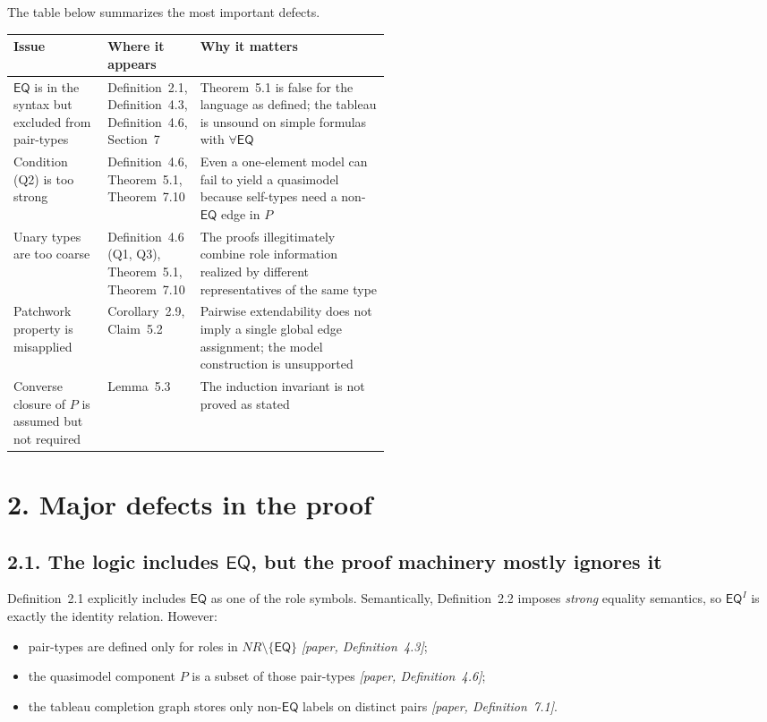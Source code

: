 \documentclass[11pt]{article}
\newcommand{\Paper}[1]{\textit{[paper, #1]}}
\newcommand{\role}[1]{\ensuremath{\mathsf{#1}}}
\newcommand{\EQ}{\role{EQ}}
\begin{document}
The table below summarizes the most important defects.

\begin{center}
\renewcommand{\arraystretch}{1.25}
\begin{tabularx}{\linewidth}{>{\raggedright\arraybackslash}p{0.25\linewidth}>{\raggedright\arraybackslash}p{0.24\linewidth}X}
\toprule
\textbf{Issue} & \textbf{Where it appears} & \textbf{Why it matters} \\
\midrule
$\EQ$ is in the syntax but excluded from pair-types & Definition~2.1, Definition~4.3, Definition~4.6, Section~7 & Theorem~5.1 is false for the language as defined; the tableau is unsound on simple formulas with $\forall \EQ$ \\
\addlinespace[0.2em]
Condition (Q2) is too strong & Definition~4.6, Theorem~5.1, Theorem~7.10 & Even a one-element model can fail to yield a quasimodel because self-types need a non-$\EQ$ edge in $P$ \\
\addlinespace[0.2em]
Unary types are too coarse & Definition~4.6 (Q1, Q3), Theorem~5.1, Theorem~7.10 & The proofs illegitimately combine role information realized by different representatives of the same type \\
\addlinespace[0.2em]
Patchwork property is misapplied & Corollary~2.9, Claim~5.2 & Pairwise extendability does not imply a single global edge assignment; the model construction is unsupported \\
\addlinespace[0.2em]
Converse closure of $P$ is assumed but not required & Lemma~5.3 & The induction invariant is not proved as stated \\
\bottomrule
\end{tabularx}
\end{center}

\section*{2. Major defects in the proof}

\subsection*{2.1. The logic includes $\EQ$, but the proof machinery mostly ignores it}

Definition~2.1 explicitly includes $\EQ$ as one of the role symbols. Semantically, Definition~2.2 imposes \emph{strong} equality semantics, so $\EQ^I$ is exactly the identity relation. However:

\begin{itemize}
    \item pair-types are defined only for roles in $NR \setminus \{\EQ\}$ \Paper{Definition~4.3};
    \item the quasimodel component $P$ is a subset of those pair-types \Paper{Definition~4.6};
    \item the tableau completion graph stores only non-$\EQ$ labels on distinct pairs \Paper{Definition~7.1}.
\end{itemize}
\end{document}
